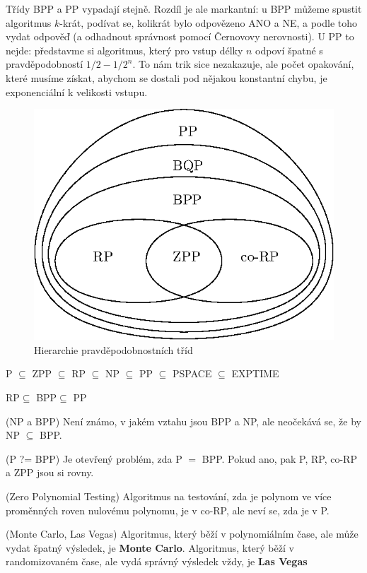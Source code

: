 \poz Třídy BPP a PP vypadají stejně. Rozdíl je ale markantní: u BPP můžeme
spustit algoritmus $k$-krát, podívat se, kolikrát bylo odpovězeno ANO a NE, a
podle toho vydat odpověď (a odhadnout správnost pomocí Černovovy nerovnosti). U
PP to nejde: představme si algoritmus, který pro vstup délky $n$ odpoví špatné s
pravděpodobností $1/2-1/2^n$. To nám trik sice nezakazuje, ale počet opakování,
které musíme získat, abychom se dostali pod nějakou konstantní chybu, je
exponenciální k velikosti vstupu.

\begin{figure}
	\centering
	\includegraphics{img/rp-hierarchy.eps}
	\caption{Hierarchie pravděpodobnostních tříd}
\end{figure}

\vt P $\subseteq$ ZPP $\subseteq$ RP $\subseteq$ NP  $\subseteq$ PP $\subseteq$
PSPACE $\subseteq$ EXPTIME

\vt RP$\subseteq$ BPP$\subseteq$ PP

\vt (NP a BPP) Není známo, v jakém vztahu jsou BPP a NP, ale neočekává se, že by
NP $\subseteq$ BPP.

\tv (P ?= BPP) Je otevřený problém, zda P $=$ BPP. Pokud ano, pak P, RP, co-RP a
ZPP jsou si rovny.

\tv (Zero Polynomial Testing) Algoritmus na testování, zda je polynom ve více
proměnných roven nulovému polynomu, je v co-RP, ale  neví se, zda je v P.

\df (Monte Carlo, Las Vegas) Algoritmus, který běží v polynomiálním čase, ale
může vydat špatný výsledek, je {\bf Monte Carlo}. Algoritmus, který běží v
randomizovaném čase, ale vydá správný výsledek vždy, je {\bf Las Vegas}

